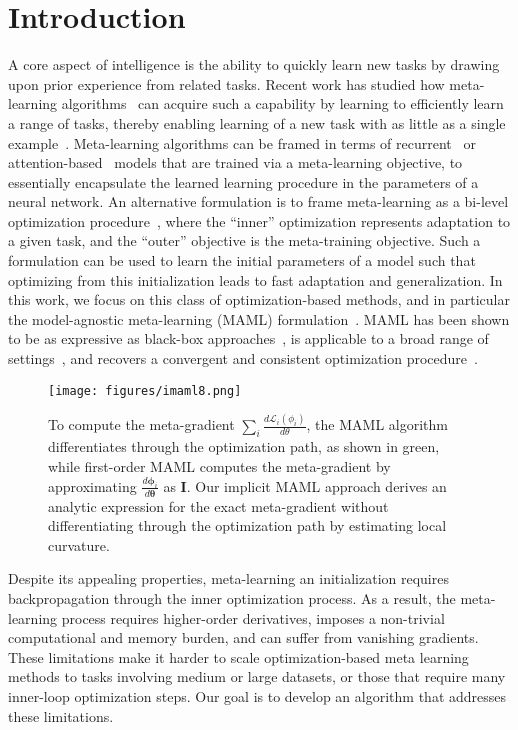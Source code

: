 \documentclass{article} \usepackage[nonatbib, final]{mod_neurips}
\newcommand{\eye}{\boldsymbol{I}}
\newcommand{\param}{{\bm{\phi}}}               \newcommand{\paramspace}{\Phi}
\newcommand{\prior}{{\bm{\theta}}}               \newcommand{\priorspace}{\Theta}
\begin{document}
\section{Introduction}
A core aspect of intelligence is the ability to quickly learn new tasks by drawing upon prior experience from related tasks. Recent work has studied how meta-learning algorithms~\cite{schmidhuber1987, thrun, naik} can acquire such a capability by learning to efficiently learn a range of tasks, thereby enabling learning of a new task with as little as a single example~\cite{mann,matchingnets,maml}. 
Meta-learning algorithms can be framed in terms of recurrent~\cite{hochreiter,mann,ravi2016optimization} or attention-based~\cite{matchingnets,mishra2017simple} models that are trained via a meta-learning objective, to essentially encapsulate the learned learning procedure in the parameters of a neural network.
An alternative formulation is to frame meta-learning as a bi-level optimization procedure~\cite{maclaurin2015gradient,maml}, where the ``inner'' optimization represents adaptation to a given task, and the ``outer'' objective is the meta-training objective. Such a formulation can be used to learn the initial parameters of a model such that optimizing from this initialization leads to fast adaptation and generalization. In this work, we focus on this class of optimization-based methods, and in particular the model-agnostic meta-learning (MAML) formulation~\cite{maml}. MAML has been shown to be as expressive as black-box approaches~\cite{universality}, is applicable to a broad range of settings~\cite{finn2017one,langauge_maml,AlShedivat2017ContinuousAV,ftml}, and recovers a convergent and consistent optimization procedure~\cite{finn2018learning}.

\begin{figure}[t!]
\centering
\texttt{[image: figures/imaml8.png]}
\caption{To compute the meta-gradient $\sum_i\frac{d\mathcal{L}_i(\phi_i)}{d\theta}$, the MAML algorithm differentiates through the optimization path, as shown in green, while first-order MAML computes the meta-gradient by approximating $\frac{d\param_i}{d\prior}$ as $\eye$. Our implicit MAML approach derives an analytic expression for the exact meta-gradient without differentiating through the optimization path by estimating local curvature.}
\label{fig:diagram}
\vspace*{-0.5cm}
\end{figure}

Despite its appealing properties, meta-learning an initialization requires backpropagation through the inner optimization process. As a result, the meta-learning process requires higher-order derivatives, imposes a non-trivial computational and memory burden, and can suffer from vanishing gradients. These limitations make it harder to scale optimization-based meta learning methods to tasks involving medium or large datasets, or those that require many inner-loop optimization steps. Our goal is to develop an algorithm that addresses these limitations. 
\end{document}
